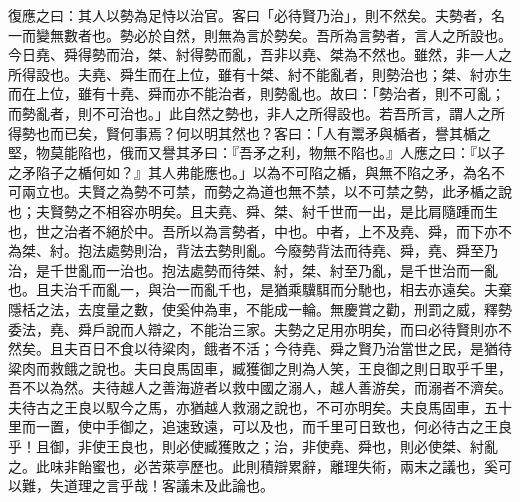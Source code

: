 \begin{pinyinscope}
復應之曰：其人以勢為足恃以治官。客曰「必待賢乃治」，則不然矣。夫勢者，名一而變無數者也。勢必於自然，則無為言於勢矣。吾所為言勢者，言人之所設也。今日堯、舜得勢而治，桀、紂得勢而亂，吾非以堯、桀為不然也。雖然，非一人之所得設也。夫堯、舜生而在上位，雖有十桀、紂不能亂者，則勢治也；桀、紂亦生而在上位，雖有十堯、舜而亦不能治者，則勢亂也。故曰：「勢治者，則不可亂；而勢亂者，則不可治也。」此自然之勢也，非人之所得設也。若吾所言，謂人之所得勢也而已矣，賢何事焉？何以明其然也？客曰：「人有鬻矛與楯者，譽其楯之堅，物莫能陷也，俄而又譽其矛曰：『吾矛之利，物無不陷也。』人應之曰：『以子之矛陷子之楯何如？』其人弗能應也。」以為不可陷之楯，與無不陷之矛，為名不可兩立也。夫賢之為勢不可禁，而勢之為道也無不禁，以不可禁之勢，此矛楯之說也；夫賢勢之不相容亦明矣。且夫堯、舜、桀、紂千世而一出，是比肩隨踵而生也，世之治者不絕於中。吾所以為言勢者，中也。中者，上不及堯、舜，而下亦不為桀、紂。抱法處勢則治，背法去勢則亂。今廢勢背法而待堯、舜，堯、舜至乃治，是千世亂而一治也。抱法處勢而待桀、紂，桀、紂至乃亂，是千世治而一亂也。且夫治千而亂一，與治一而亂千也，是猶乘驥駬而分馳也，相去亦遠矣。夫棄隱栝之法，去度量之數，使奚仲為車，不能成一輪。無慶賞之勸，刑罰之威，釋勢委法，堯、舜戶說而人辯之，不能治三家。夫勢之足用亦明矣，而曰必待賢則亦不然矣。且夫百日不食以待粱肉，餓者不活；今待堯、舜之賢乃治當世之民，是猶待粱肉而救餓之說也。夫曰良馬固車，臧獲御之則為人笑，王良御之則日取乎千里，吾不以為然。夫待越人之善海遊者以救中國之溺人，越人善游矣，而溺者不濟矣。夫待古之王良以馭今之馬，亦猶越人救溺之說也，不可亦明矣。夫良馬固車，五十里而一置，使中手御之，追速致遠，可以及也，而千里可日致也，何必待古之王良乎！且御，非使王良也，則必使臧獲敗之；治，非使堯、舜也，則必使桀、紂亂之。此味非飴蜜也，必苦萊亭歷也。此則積辯累辭，離理失術，兩末之議也，奚可以難，失道理之言乎哉！客議未及此論也。


\end{pinyinscope}